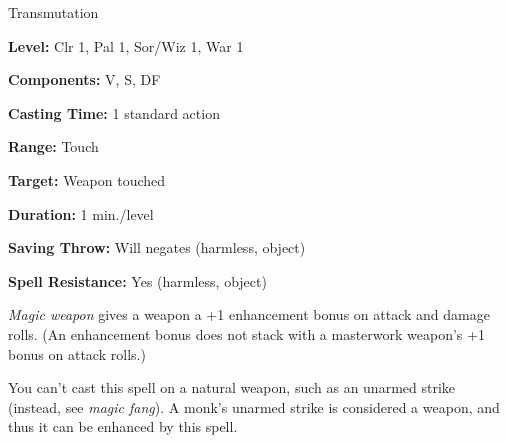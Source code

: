 
Transmutation

\textbf{Level:} Clr 1, Pal 1, Sor/Wiz 1, War 1

\textbf{Components:} V, S, DF

\textbf{Casting Time:} 1 standard action

\textbf{Range:} Touch

\textbf{Target:} Weapon touched

\textbf{Duration:} 1 min./level

\textbf{Saving Throw:} Will negates (harmless, object)

\textbf{Spell Resistance:} Yes (harmless, object)

\textit{Magic weapon} gives a weapon a +1 enhancement bonus on attack and damage 
rolls. (An enhancement bonus does not stack with a masterwork weapon's +1 bonus 
on attack rolls.)

You can't cast this spell on a natural weapon, such as an unarmed strike (instead, 
see \textit{magic fang}). A monk's unarmed strike is considered a weapon, and thus 
it can be enhanced by this spell.

